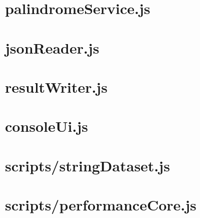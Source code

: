 \section*{palindromeService.js}


\section*{jsonReader.js}


\section*{resultWriter.js}


\section*{consoleUi.js}


\section*{scripts/stringDataset.js}


\section*{scripts/performanceCore.js}


